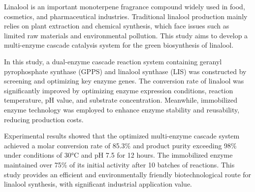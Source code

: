 \documentclass[UTF8,AutoFakeBold=1,AutoFakeSlant,zihao=-4]{HZAU}
\numberwithin{figure}{section}
\numberwithin{table}{section}
\numberwithin{equation}{section}
\newcommand{\thesisTitleC}{多酶级联催化绿色合成芳樟醇的研究}
\begin{document}
\begin{abstractEN}


Linalool is an important monoterpene fragrance compound widely used in food, cosmetics, and pharmaceutical industries. Traditional linalool production mainly relies on plant extraction and chemical synthesis, which face issues such as limited raw materials and environmental pollution. This study aims to develop a multi-enzyme cascade catalysis system for the green biosynthesis of linalool.

In this study, a dual-enzyme cascade reaction system containing geranyl pyrophosphate synthase (GPPS) and linalool synthase (LIS) was constructed by screening and optimizing key enzyme genes. The conversion rate of linalool was significantly improved by optimizing enzyme expression conditions, reaction temperature, pH value, and substrate concentration. Meanwhile, immobilized enzyme technology was employed to enhance enzyme stability and reusability, reducing production costs.

Experimental results showed that the optimized multi-enzyme cascade system achieved a molar conversion rate of 85.3\% and product purity exceeding 98\% under conditions of 30°C and pH 7.5 for 12 hours. The immobilized enzyme maintained over 75\% of its initial activity after 10 batches of reactions. This study provides an efficient and environmentally friendly biotechnological route for linalool synthesis, with significant industrial application value.
\end{abstractEN}


\contentpage


\pagestyle{fancy}
\setcounter{page}{1}
\fancyhf{}
\fancyhead[CO]{\fontsize{10.5pt}{10.5pt}\selectfont{\thesisTitleC}}  %
\fancyhead[CE]{\fontsize{10.5pt}{10.5pt}\selectfont{华中农业大学2026届学士学位毕业论文}}  %
\fancyfoot[C]{\fontsize{9pt}{9pt}\selectfont{\thepage}}
\renewcommand{\headrulewidth}{1pt}
\renewcommand{\footrulewidth}{0pt}
\end{document}
